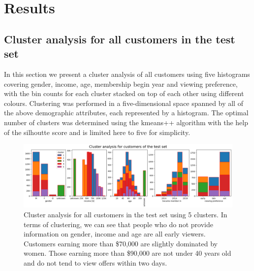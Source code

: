 \documentclass[11pt]{article} %
\begin{document}
\section{Results}



\subsection{Cluster analysis for all customers in the test set}
In this section we present a cluster analysis of all customers using five histograms covering gender, income, age, membership begin year and viewing preference, with the bin counts for each cluster stacked on top of each other using different colours. Clustering was performed in a five-dimensional space spanned by all of the above demographic attributes, each represented by a histogram.
The optimal number of clusters was determined using the kmeans++ algorithm with the help of the silhoutte score and is limited here to five for simplicity.


\begin{figure}[H]
\includegraphics[width=1\textwidth]{results/results_test_set.png}
\caption{Cluster analysis for all customers in the test set using 5 clusters. In terms of clustering, we can see that people who do not provide information on gender, income and age are all early viewers. 
Customers earning more than \$70,000 are slightly dominated by women. Those earning more than \$90,000 are not under 40 years old and do not tend to view offers within two days.}
\end{figure}
\end{document}
